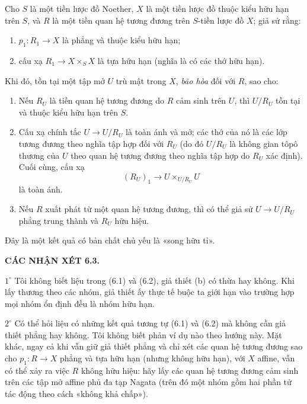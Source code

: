 Cho $S$ là một tiền lược đồ Noether, $X$ là một tiền
lược đồ thuộc kiểu hữu hạn trên $S$, và $R$ là một tiền quan hệ tương đương trên
$S$-tiền lược đồ $X$; giả sử rằng:
\begin{enumerate}
\item[(a)] $p_1:R_1\to X$ là phẳng và thuộc kiểu hữu hạn;
\item[(b)] cấu xạ $R_1\to X\times_S X$ là tựa hữu hạn (nghĩa là có các thớ
hữu hạn).
\end{enumerate}
Khi đó, tồn tại một tập mở $U$ trù mật trong $X$, \emph{bão hòa} đối với $R$,
sao cho:
\begin{enumerate}
\item[(i)] Nếu $R_U$ là tiền quan hệ tương đương do $R$ cảm sinh trên $U$,
thì $U/R_U$ tồn tại và thuộc kiểu hữu hạn trên $S$.

\item[(ii)] Cấu xạ chính tắc $U\to U/R_U$ là toàn ánh và mở; các thớ của nó
là các lớp tương đương theo nghĩa tập hợp đối với $R_U$ (do đó $U/R_U$ là
không gian tôpô thương của $U$ theo quan hệ tương đương theo nghĩa tập hợp do
$R_U$ xác định). Cuối cùng, cấu xạ
\[
  (R_U)_1\longrightarrow U\times_{U/R_U}U
\]
là toàn ánh.

\item[(iii)] Nếu $R$ xuất phát từ một quan hệ tương đương, thì có thể giả sử
$U\to U/R_U$ phẳng trung thành và $R_U$ hữu hiệu.
\end{enumerate}

Đây là một kết quả có bản chất chủ yếu là «song hữu tỉ».

\medskip
\noindent\textbf{CÁC NHẬN XÉT 6.3.}

\smallskip
\noindent $1^\circ$ Tôi không biết liệu trong (6.1) và (6.2), giả thiết (b) có
thừa hay không. Khi lấy thương theo các nhóm, giả thiết ấy thực tế buộc ta
giới hạn vào trường hợp mọi nhóm ổn định đều là nhóm hữu hạn.

\smallskip
\noindent $2^\circ$ Có thể hỏi liệu có những kết quả tương tự (6.1) và (6.2)
mà không cần giả thiết phẳng hay không. Tôi không biết phản ví dụ nào theo
hướng này. Mặt khác, ngay cả khi vẫn giữ giả thiết phẳng và chỉ xét các quan
hệ tương đương sao cho $p_1:R\to X$ phẳng và tựa hữu hạn (nhưng không hữu
hạn), với $X$ affine, vẫn có thể xảy ra việc $R$ không hữu hiệu: hãy lấy các
quan hệ tương đương cảm sinh trên các tập mở affine phủ đa tạp Nagata (trên đó
một nhóm gồm hai phần tử tác động theo cách «không khả chấp»).


